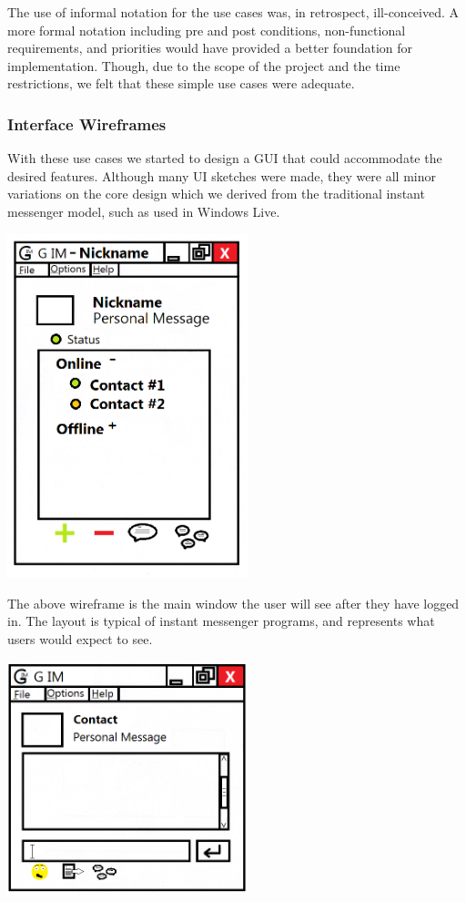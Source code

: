 The use of informal notation for the use cases was, in retrospect, ill-conceived. A more formal notation including pre and post conditions, non-functional requirements, and priorities would have provided a better foundation for implementation. Though, due to the scope of the project and the time restrictions, we felt that these simple use cases were adequate.

\subsubsection{Interface Wireframes}

With these use cases we started to design a GUI that could accommodate the desired features. Although many UI sketches were made, they were all minor variations on the core design which we derived from the traditional instant messenger model, such as used in Windows Live.

\includegraphics[width=7cm]{Design/diagrams/Main_UI.png}

The above wireframe is the main window the user will see after they have logged in. The layout is typical of instant messenger programs, and represents what users would expect to see.

\includegraphics[width=7cm]{Design/diagrams/Chat_Box.png}


